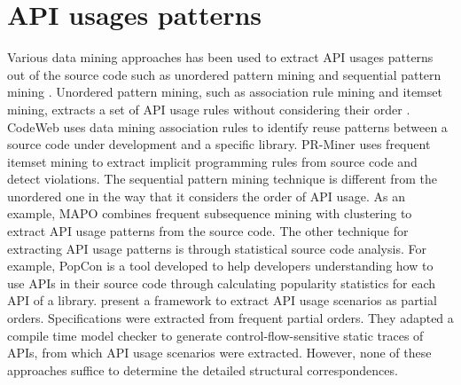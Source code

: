 \section{API usages patterns}  \label{ch7-usage-patterns}

Various data mining approaches has been used to extract API usages patterns out of the source code such as unordered pattern mining and sequential pattern mining \cite{robillard2013automated}. Unordered pattern mining, such as association rule mining and itemset mining, extracts a set of API usage rules without considering their order \cite{agrawal1994fast}. CodeWeb \cite{michail2000data} uses data mining association rules to identify reuse patterns between a source code under development and a specific library. PR-Miner \cite{li2005pr} uses frequent itemset mining to extract implicit programming rules from source code and detect violations. The sequential pattern mining technique is different from the unordered one in the way that it considers the order of API usage. As an example, MAPO \cite{xie2006mapo} combines frequent subsequence mining with clustering to extract API usage patterns from the source code. The other technique for extracting API usage patterns is through statistical source code analysis. For example, PopCon \cite{holmes2008newbie} is a tool developed to help developers understanding how to use APIs in their source code through calculating popularity statistics for each API of a library. \citet{acharya2007mining} present a framework to extract API usage scenarios as partial orders. Specifications were extracted from frequent partial orders. They adapted a compile time model checker to generate control-flow-sensitive static traces of APIs, from which API usage scenarios were extracted. However, none of these approaches suffice to determine the detailed structural correspondences.

